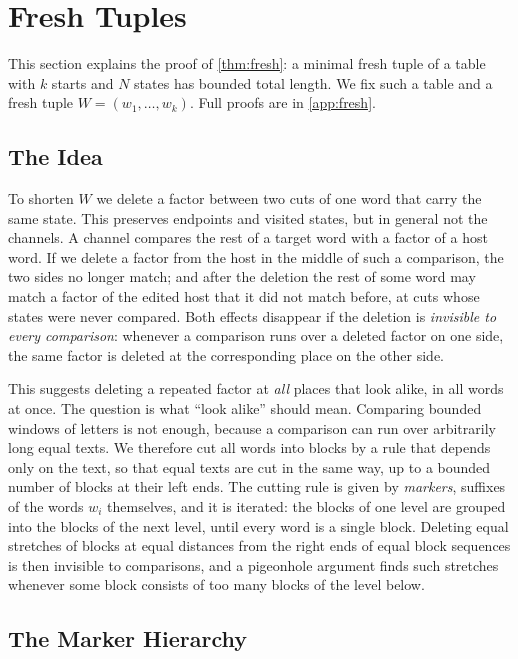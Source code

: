 \section{Fresh Tuples}
\label{sec:fresh}

This section explains the proof of \cref{thm:fresh}: a minimal fresh tuple
of a table with $k$ starts and $N$ states has bounded total length. We fix
such a table and a fresh tuple $W=(w_1,\dots,w_k)$. Full proofs are in
\cref{app:fresh}.

\subsection{The Idea}\label{sec:fresh-idea}

To shorten $W$ we delete a factor between two cuts of one word that carry
the same state. This preserves endpoints and visited states, but in general
not the channels. A channel compares the rest of a target word with a factor
of a host word. If we delete a factor from the host in the middle of such a
comparison, the two sides no longer match; and after the deletion the rest
of some word may match a factor of the edited host that it did not match
before, at cuts whose states were never compared. Both effects disappear if
the deletion is \emph{invisible to every comparison}: whenever a comparison
runs over a deleted factor on one side, the same factor is deleted at the
corresponding place on the other side.

This suggests deleting a repeated factor at \emph{all} places that look
alike, in all words at once. The question is what ``look alike'' should
mean. Comparing bounded windows of letters is not enough, because a
comparison can run over arbitrarily long equal texts. We therefore cut all
words into blocks by a rule that depends only on the text, so that equal
texts are cut in the same way, up to a bounded number of blocks at their left
ends. The cutting rule is given by \emph{markers}, suffixes of the words
$w_i$ themselves, and it is iterated: the blocks of one level are grouped
into the blocks of the next level, until every word is a single block.
Deleting equal stretches of blocks at equal distances from the right ends of
equal block sequences is then invisible to comparisons, and a pigeonhole
argument finds such stretches whenever some block consists of too many
blocks of the level below.

\subsection{The Marker Hierarchy}\label{sec:fresh-hierarchy}

